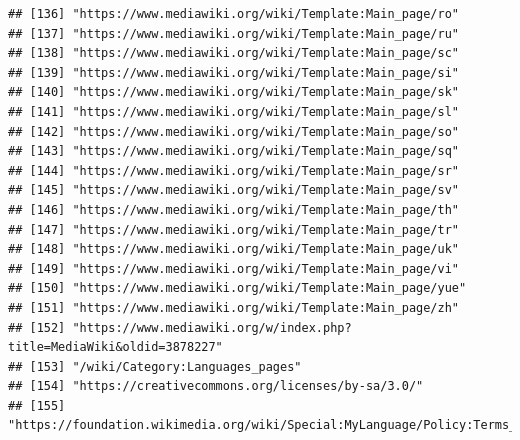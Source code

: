 \documentclass[
]{article}
\begin{document}
\begin{verbatim}
## [136] "https://www.mediawiki.org/wiki/Template:Main_page/ro"                                                                        
## [137] "https://www.mediawiki.org/wiki/Template:Main_page/ru"                                                                        
## [138] "https://www.mediawiki.org/wiki/Template:Main_page/sc"                                                                        
## [139] "https://www.mediawiki.org/wiki/Template:Main_page/si"                                                                        
## [140] "https://www.mediawiki.org/wiki/Template:Main_page/sk"                                                                        
## [141] "https://www.mediawiki.org/wiki/Template:Main_page/sl"                                                                        
## [142] "https://www.mediawiki.org/wiki/Template:Main_page/so"                                                                        
## [143] "https://www.mediawiki.org/wiki/Template:Main_page/sq"                                                                        
## [144] "https://www.mediawiki.org/wiki/Template:Main_page/sr"                                                                        
## [145] "https://www.mediawiki.org/wiki/Template:Main_page/sv"                                                                        
## [146] "https://www.mediawiki.org/wiki/Template:Main_page/th"                                                                        
## [147] "https://www.mediawiki.org/wiki/Template:Main_page/tr"                                                                        
## [148] "https://www.mediawiki.org/wiki/Template:Main_page/uk"                                                                        
## [149] "https://www.mediawiki.org/wiki/Template:Main_page/vi"                                                                        
## [150] "https://www.mediawiki.org/wiki/Template:Main_page/yue"                                                                       
## [151] "https://www.mediawiki.org/wiki/Template:Main_page/zh"                                                                        
## [152] "https://www.mediawiki.org/w/index.php?title=MediaWiki&oldid=3878227"                                                         
## [153] "/wiki/Category:Languages_pages"                                                                                              
## [154] "https://creativecommons.org/licenses/by-sa/3.0/"                                                                             
## [155] "https://foundation.wikimedia.org/wiki/Special:MyLanguage/Policy:Terms_of_Use"                                                

\end{verbatim}
\end{document}

